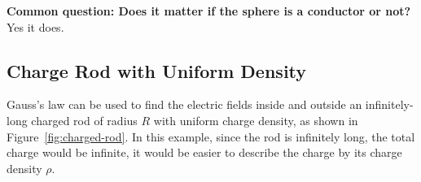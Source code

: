 \begin{remark}
  \textbf{Common question: Does it matter if the sphere is a conductor or
    not?} Yes it does.
\end{remark}






\subsection{Charge Rod with Uniform Density}
Gauss's law can be used to find the electric fields inside and outside an
infinitely-long charged rod of radius $R$ with uniform charge density, as shown
in Figure~\ref{fig:charged-rod}. In this example, since the rod is infinitely
long, the total charge would be infinite, it would be easier to describe the
charge by its charge density $\rho$.
